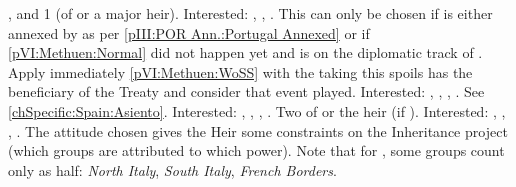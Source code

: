 \provinceGibraltar, \provinceBaleares and 1
\COL (of \HIS or a major heir).  Interested: \ENG, \HOL, \SPA.
 This can only be chosen if
\paysportugal is either annexed by \HIS as per \ref{pIII:POR Ann.:Portugal
  Annexed} or if \ref{pVI:Methuen:Normal} did not happen yet and \paysportugal
is on the diplomatic track of \HIS. Apply immediately \ref{pVI:Methuen:WoSS}
with the \MAJ taking this spoils has the beneficiary of the Treaty and
consider that event played. Interested: \FRA, \ENG, \HOL, \SPA.
\bparag[Asiento] See \ref{chSpecific:Spain:Asiento}. Interested: \FRA, \ENG,
\HOL, \SPA.
 Two \COL of \HIS or the heir (if \MAJ). Interested:
\ANG, \FRA, \HOL, \HIS.
\aparag The attitude chosen gives the Heir some constraints on the Inheritance
project (which groups are attributed to which power).
\bparag Note that for \AUS, some groups count only as half: \emph{North
  Italy}, \emph{South Italy}, \emph{French Borders}.

